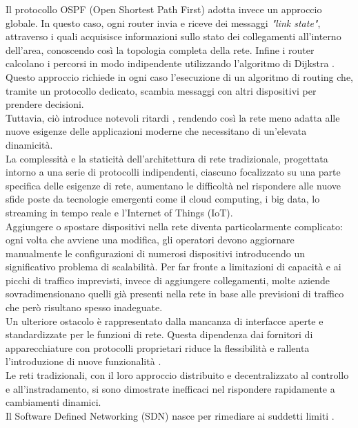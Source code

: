 Il protocollo OSPF (Open Shortest Path First) adotta invece un approccio globale.
In questo caso, ogni router invia e riceve dei messaggi \textit{"link state"}, attraverso i quali acquisisce informazioni sullo stato dei collegamenti
all'interno dell'area, conoscendo così la topologia completa della rete.
Infine i router calcolano i percorsi in modo indipendente utilizzando l'algoritmo di Dijkstra \cite{ospf}. 
\\Questo approccio richiede in ogni caso l'esecuzione di un algoritmo di routing che, tramite un protocollo dedicato, 
scambia messaggi con altri dispositivi per prendere decisioni.
\\Tuttavia, ciò introduce notevoli ritardi \cite{tesiSDN:2017}, rendendo così la rete meno adatta alle nuove esigenze delle applicazioni moderne che necessitano di un'elevata dinamicità.
\\La complessità e la staticità dell'architettura di rete tradizionale, progettata intorno a una serie di protocolli indipendenti, ciascuno focalizzato su una parte specifica delle esigenze di rete, 
aumentano le difficoltà nel rispondere alle nuove sfide poste da tecnologie emergenti come il cloud computing, i big data, lo streaming in tempo reale e l'Internet of Things (IoT).
\\Aggiungere o spostare dispositivi nella rete diventa particolarmente complicato: ogni volta che avviene una modifica, gli operatori devono aggiornare manualmente le configurazioni di numerosi dispositivi introducendo un significativo problema di scalabilità.
Per far fronte a limitazioni di capacità e ai picchi di traffico imprevisti, invece di aggiungere collegamenti, molte aziende sovradimensionano quelli già presenti nella rete in base alle previsioni di traffico che però risultano spesso inadeguate.
\\Un ulteriore ostacolo è rappresentato dalla mancanza di interfacce aperte e standardizzate per le funzioni di rete. %
Questa dipendenza dai fornitori di apparecchiature con protocolli proprietari riduce la flessibilità e rallenta l'introduzione di nuove funzionalità \cite{probtrad}.
\\Le reti tradizionali, con il loro approccio distribuito e decentralizzato al controllo e all'instradamento, si sono dimostrate inefficaci nel rispondere rapidamente a cambiamenti dinamici.
\\Il Software Defined Networking (SDN) nasce per rimediare ai suddetti limiti \cite{sdnsurvey}.
